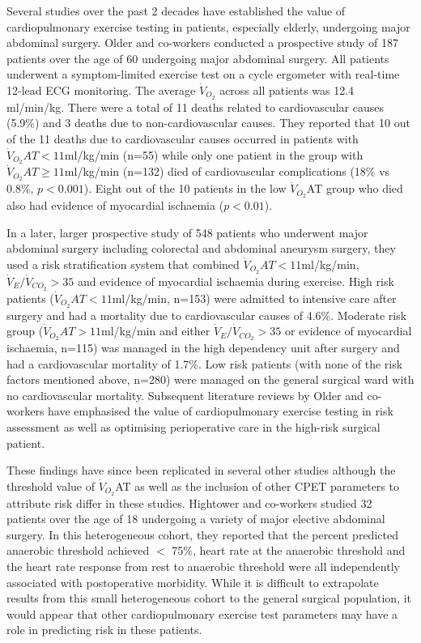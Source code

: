 Several studies over the past 2 decades have established the value of cardiopulmonary exercise testing in patients, especially elderly, undergoing major abdominal surgery. Older and co-workers conducted a prospective study of 187 patients over the age of 60 undergoing major abdominal surgery. All patients underwent a symptom-limited exercise test on a cycle ergometer with real-time 12-lead ECG monitoring. The average $\dot{V}_{O_2}$ across all patients was 12.4 ml/min/kg. There were a total of 11 deaths related to cardiovascular causes (5.9\%) and 3 deaths due to non-cardiovascular causes. They reported that 10 out of the 11 deaths due to cardiovascular causes occurred in patients with $\dot{V}_{O_2}AT<11$ml/kg/min (n=55) while only one patient in the group with $\dot{V}_{O_2}AT\geq11$ml/kg/min (n=132) died of cardiovascular complications (18\% vs 0.8\%, $p<0.001$). Eight out of the 10 patients in the low $\dot{V}_{O_2}$AT group who died also had evidence of myocardial ischaemia ($p<0.01$).\parencite{older_preoperative_1993}
 
In a later, larger prospective study of 548 patients who underwent major abdominal surgery including colorectal and abdominal aneurysm surgery, they used a risk stratification system that combined $\dot{V}_{O_2}AT<11$ml/kg/min, $\dot{V}_E/\dot{V}_{CO_2}>35$ and evidence of myocardial ischaemia during exercise. High risk patients ($\dot{V}_{O_2}AT<11$ml/kg/min, n=153) were admitted to intensive care after surgery and had a mortality due to cardiovascular causes of 4.6\%. Moderate risk group ($\dot{V}_{O_2}AT>11$ml/kg/min and either $\dot{V}_E/\dot{V}_{CO_2}>35$ or evidence of myocardial ischaemia, n=115) was managed in the high dependency unit after surgery and had a cardiovascular mortality of 1.7\%. Low risk patients (with none of the risk factors mentioned above, n=280) were managed on the general surgical ward with no cardiovascular mortality.\parencite{older_cardiopulmonary_1999} Subsequent literature reviews by Older and co-workers have emphasised the value of cardiopulmonary exercise testing in risk assessment as well as optimising perioperative care in the high-risk surgical patient. \parencite{older_preoperative_2000, older_clinical_2004, older_preoperative_2005}

These findings have since been replicated in several other studies although the threshold value of $\dot{V}_{O_2}$AT as well as the inclusion of other CPET parameters to attribute risk differ in these studies. Hightower and co-workers studied 32 patients over the age of 18 undergoing a variety of major elective abdominal surgery. In this heterogeneous cohort, they reported that the percent predicted anaerobic threshold achieved $<$ 75\%, heart rate at the anaerobic threshold and the heart rate response from rest to anaerobic threshold were all independently associated with postoperative morbidity. While it is difficult to extrapolate results from this small heterogeneous cohort to the general surgical population, it would appear that other cardiopulmonary exercise test parameters may have a role in predicting risk in these patients.\parencite{hightower_pilot_2010}

